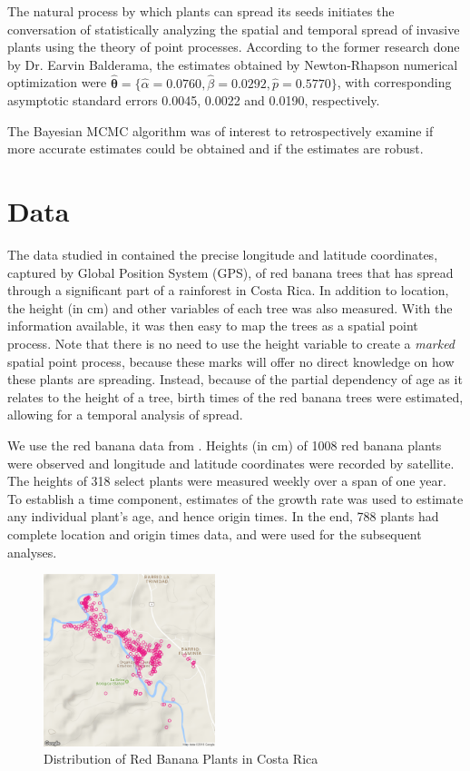 \documentclass[11pt]{article}\usepackage[]{graphicx}\usepackage[]{color}
\newcommand{\bfig}{\begin{figure}}
\newcommand{\efig}{\end{figure}}
\begin{document}
{The natural process by which plants can spread its seeds initiates the conversation of statistically analyzing the spatial and temporal spread of invasive plants using the theory of point processes. According to the former research done by Dr. Earvin Balderama, the estimates obtained by Newton-Rhapson numerical optimization were $\boldsymbol{\hat\theta} = \{\hat\alpha = 0.0760, \hat\beta = 0.0292, \hat p = 0.5770\}$, with corresponding asymptotic standard errors 0.0045, 0.0022 and 0.0190, respectively. 

The Bayesian MCMC algorithm was of interest to retrospectively examine if more accurate estimates could be obtained and if the estimates are robust.
\section{Data}



The data studied in \cite{Balderama12} contained the precise longitude and latitude coordinates, captured by Global Position System (GPS), of red banana trees that has spread through a significant part of a rainforest in Costa Rica. In addition to location, the height (in cm) and other variables of each tree was also measured. With the information available, it was then easy to map the trees as a spatial point process. Note that there is no need to use the height variable to create a {\it marked} spatial point process, because these marks will offer no direct knowledge on how these plants are spreading. Instead, because of the partial dependency of age as it relates to the height of a tree, birth times of the red banana trees were estimated, allowing for a temporal analysis of spread.


We use the red banana data from \cite{Balderama12}. Heights (in cm) of 1008 red banana plants were observed and longitude and latitude coordinates were recorded by satellite. The heights of 318 select plants were measured weekly over a span of one year. To establish a time component, estimates of the growth rate was used to estimate any individual plant's age, and hence origin times. In the end, 788 plants had complete location and origin times data, and were used for the subsequent analyses.

\bfig\centering
\includegraphics[width=5cm]{figures/redbanana.png}
\caption{Distribution of Red Banana Plants in Costa Rica}
\label{Map1}
\efig

}
\end{document}
